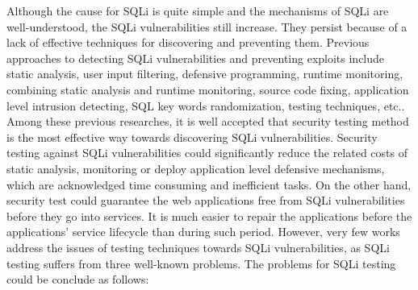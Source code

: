 \documentclass{sig-alternate}
\begin{document}
Although the cause for SQLi is quite simple and the mechanisms of SQLi are well-understood, the SQLi vulnerabilities still increase. They persist because of a lack of effective techniques for discovering and preventing them. Previous approaches to detecting SQLi  vulnerabilities and preventing exploits include static analysis\cite{su06essence, livshits05finding, fu2007static}, user input filtering\cite{leblanc2002writing}, defensive programming\cite{cook2005safe}, runtime monitoring\cite{buehrer2005using, halfond2006using, pietraszek2006defending, su2006essence}, combining static analysis and runtime monitoring\cite{ase05:amneisa}, source code fixing\cite{thomas2007using}, application level intrusion detecting\cite{lin2007automatic}, SQL key words randomization\cite{boyd2004sqlrand}, testing techniques\cite{shahriar2008music, appelt2014automated, kieyzun2009automatic}, etc.. Among these previous researches, it is well accepted that security testing method is the most effective way towards discovering SQLi vulnerabilities. Security testing against SQLi vulnerabilities could significantly reduce the related costs of static analysis, monitoring or deploy application level defensive mechanisms, which are acknowledged time consuming and inefficient tasks. On the other hand, security test could guarantee the web applications free from SQLi vulnerabilities before they go into services. It is much easier to repair the applications before the applications' service lifecycle than during such period. However, very few works address the issues of testing techniques towards SQLi vulnerabilities, as SQLi testing suffers from three well-known problems. The problems for SQLi testing could be conclude as follows:
\end{document}
